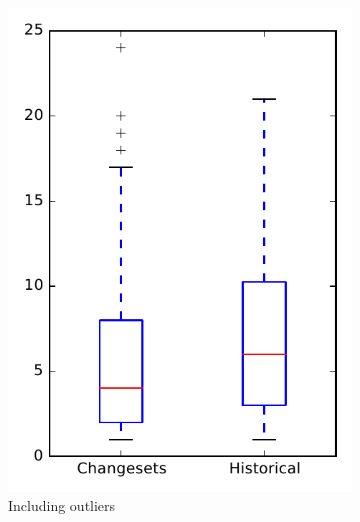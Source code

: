 
\begin{figure}
    \centering
    \begin{subfigure}{.4\textwidth}
        \centering
        \includegraphics[height=0.4\textheight]{figures/dit/rq2_openjpa}
        \caption{Including outliers}\label{fig:dit:rq2:openjpa_outlier}
    \end{subfigure}%
    \begin{subfigure}{.4\textwidth}
        \centering

\end{subfigure}
\end{figure}
